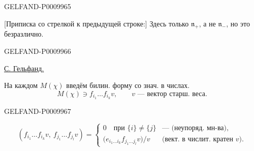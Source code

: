\begin{GelfandAdjacentEvidence}{GELFAND-P000996}{5}


[Приписка со стрелкой к предыдущей строке:] Здесь только $\mathfrak n_+$, а не $\mathfrak n_-$, но это безразлично.
\end{GelfandAdjacentEvidence}
\begin{GelfandAdjacentEvidence}{GELFAND-P000996}{6}


\underline{С. Гельфанд.}

На каждом $M(\chi)$ введём билин. форму со знач. в числах.
\[
M(\chi)\ni f_{i_1}\ldots f_{i_k}v,\qquad
v\text{ --- вектор старш. веса}.
\]
\end{GelfandAdjacentEvidence}
\begin{GelfandAdjacentEvidence}{GELFAND-P000996}{7}

\[
(f_{i_1}\ldots f_{i_k}v,\ f_{j_1}\ldots f_{j_l}v)
=
\begin{cases}
0\quad\text{при }\{i\}\ne\{j\}
 & \text{--- (неупоряд. мн-ва)},\\
\bigl(e_{i_1\ldots i_k}f_{j_1\ldots j_l}v\bigr)/v
 & \text{(вект. в числит. кратен $v$)}.
\end{cases}
\]
\end{GelfandAdjacentEvidence}



